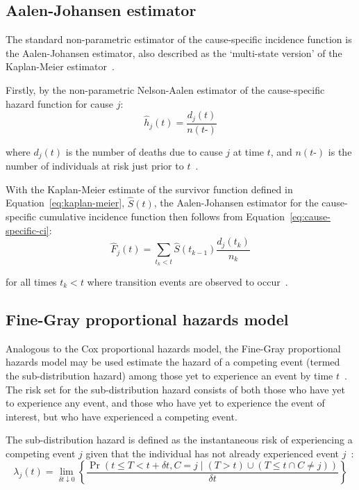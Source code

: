 \subsection{Aalen-Johansen estimator}

The standard non-parametric estimator of the cause-specific incidence function is the Aalen-Johansen estimator, also described as the `multi-state version' of the Kaplan-Meier estimator~\parencite{Aalen1978-qo}.

Firstly, by the non-parametric Nelson-Aalen estimator of the cause-specific hazard function for cause $j$:
%
\[
    \hat{h}_j(t) = \frac{d_{j}(t)}{n(t\mbox{-})}
\]

where $d_{j}(t)$ is the number of deaths due to cause $j$ at time $t$, and $n(t\mbox{-})$ is the number of individuals at risk just prior to $t$~\parencite{Borgan2014-dv}.

With the Kaplan-Meier estimate of the survivor function defined in Equation~\ref{eq:kaplan-meier}, $\hat{S}(t)$, the Aalen-Johansen estimator for the cause-specific cumulative incidence function then follows from Equation~\ref{eq:cause-specific-ci}:
%
\[
    \hat{F}_j(t) = \sum_{t_k < t} \hat{S}(t_{k-1})\frac{d_{j}(t_k)}{n_k}
\]

for all times $t_k < t$ where transition events are observed to occur~\parencite{Kalbfleisch2011-zx, Lambert2017-rz}.

\subsection{Fine-Gray proportional hazards model}

Analogous to the Cox proportional hazards model, the Fine-Gray proportional hazards model may be used estimate the hazard of a competing event (termed the sub-distribution hazard) among those yet to experience an event by time $t$~\parencite{Fine1999-rs}. The risk set for the sub-distribution hazard consists of both those who have yet to experience any event, and those who have yet to experience the event of interest, but who have experienced a competing event.

The sub-distribution hazard is defined as the instantaneous risk of experiencing a competing event $j$ given that the individual has not already experienced event $j$~\parencite{Austin2016-rl}:
%
\[
    \lambda_j(t)=\lim_{\delta t \downarrow 0}{\left\{\frac{\Pr\left(t \leq T < t + \delta t, C=j \mid (T>t) \cup (T \le t \cap C \neq j)\right)}{\delta t}\right\}}
\]

